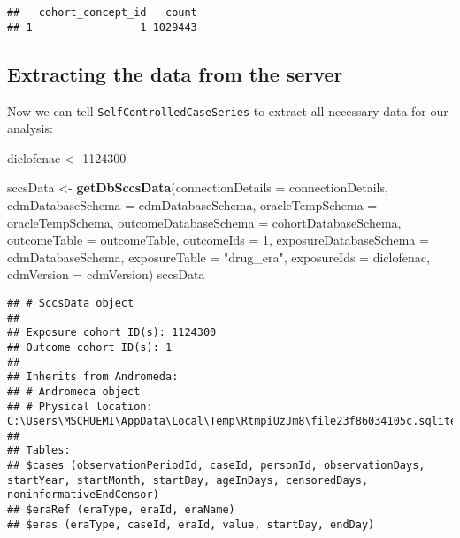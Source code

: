 \documentclass[
]{article}
\newenvironment{Shaded}{\begin{snugshade}}{\end{snugshade}}
\newcommand{\DataTypeTok}[1]{\textcolor[rgb]{0.13,0.29,0.53}{#1}}
\newcommand{\DecValTok}[1]{\textcolor[rgb]{0.00,0.00,0.81}{#1}}
\newcommand{\KeywordTok}[1]{\textcolor[rgb]{0.13,0.29,0.53}{\textbf{#1}}}
\newcommand{\NormalTok}[1]{#1}
\newcommand{\StringTok}[1]{\textcolor[rgb]{0.31,0.60,0.02}{#1}}
\begin{document}
\begin{verbatim}
##   cohort_concept_id   count
## 1                 1 1029443
\end{verbatim}

\hypertarget{extracting-the-data-from-the-server}{%
\subsection{Extracting the data from the
server}\label{extracting-the-data-from-the-server}}

Now we can tell \texttt{SelfControlledCaseSeries} to extract all
necessary data for our analysis:

\begin{Shaded}
\begin{Highlighting}[]
\NormalTok{diclofenac <-}\StringTok{ }\DecValTok{1124300}

\NormalTok{sccsData <-}\StringTok{ }\KeywordTok{getDbSccsData}\NormalTok{(}\DataTypeTok{connectionDetails =}\NormalTok{ connectionDetails,}
                          \DataTypeTok{cdmDatabaseSchema =}\NormalTok{ cdmDatabaseSchema,}
                          \DataTypeTok{oracleTempSchema =}\NormalTok{ oracleTempSchema,}
                          \DataTypeTok{outcomeDatabaseSchema =}\NormalTok{ cohortDatabaseSchema,}
                          \DataTypeTok{outcomeTable =}\NormalTok{ outcomeTable,}
                          \DataTypeTok{outcomeIds =} \DecValTok{1}\NormalTok{,}
                          \DataTypeTok{exposureDatabaseSchema =}\NormalTok{ cdmDatabaseSchema,}
                          \DataTypeTok{exposureTable =} \StringTok{"drug_era"}\NormalTok{,}
                          \DataTypeTok{exposureIds =}\NormalTok{ diclofenac,}
                          \DataTypeTok{cdmVersion =}\NormalTok{ cdmVersion)}
\NormalTok{sccsData}
\end{Highlighting}
\end{Shaded}

\begin{verbatim}
## # SccsData object
## 
## Exposure cohort ID(s): 1124300
## Outcome cohort ID(s): 1
## 
## Inherits from Andromeda:
## # Andromeda object
## # Physical location:  C:\Users\MSCHUEMI\AppData\Local\Temp\RtmpiUzJm8\file23f86034105c.sqlite
## 
## Tables:
## $cases (observationPeriodId, caseId, personId, observationDays, startYear, startMonth, startDay, ageInDays, censoredDays, noninformativeEndCensor)
## $eraRef (eraType, eraId, eraName)
## $eras (eraType, caseId, eraId, value, startDay, endDay)
\end{verbatim}
\end{document}
